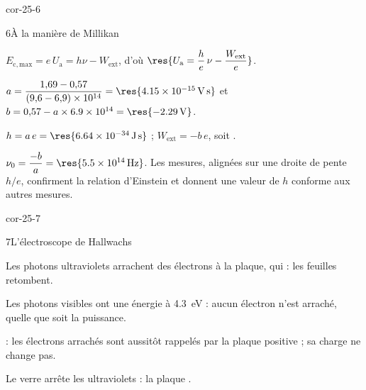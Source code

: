 \begin{blocLivre}{cor-25-6}
\begin{corrige}{6}{À la manière de Millikan}
\begin{questions}
\item $E_\mathrm{c,max}=e\,U_\mathrm{a}=h\nu-W_\mathrm{ext}$, d'où $\res{U_\mathrm{a}=\dfrac{h}{e}\,\nu-\dfrac{W_\mathrm{ext}}{e}}$.
\item $a=\dfrac{1{,}69-0{,}57}{(9{,}6-6{,}9)\times10^{14}}=\res{\qty{4,15e-15}{V.s}}$ et $b=0{,}57-a\times\num{6.9e14}=\res{\qty{-2,29}{V}}$.
\item $h=a\,e=\res{\qty{6,64e-34}{J.s}}$ ; $W_\mathrm{ext}=-b\,e$, soit .
\item $\nu_0=\dfrac{-b}{a}=\res{\qty{5,5e14}{Hz}}$. Les mesures, alignées sur une droite de pente $h/e$, confirment
 la relation d'Einstein et donnent une valeur de $h$ conforme aux autres mesures.
\end{questions}
\end{corrige}
\end{blocLivre}
\begin{blocLivre}{cor-25-7}
\begin{corrige}{7}{L'électroscope de Hallwachs}
\begin{questions}
\item Les photons ultraviolets arrachent des électrons à la plaque, qui  : les feuilles
retombent.
\item Les photons visibles ont une énergie  à \qty{4,3}{eV} : aucun électron n'est arraché, quelle que soit
la puissance.
\item {} : les électrons arrachés sont aussitôt rappelés par la plaque positive ; sa charge ne change pas.
\item Le verre arrête les ultraviolets : la plaque .
\end{questions}
\end{corrige}
\end{blocLivre}
